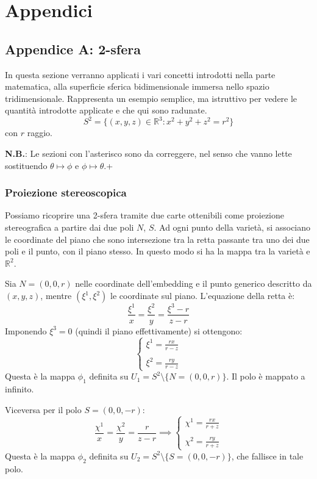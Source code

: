 \newpage
\chapter{Appendici}
\section{Appendice A: 2-sfera}
In questa sezione verranno applicati i vari concetti introdotti nella parte matematica, alla superficie sferica bidimensionale immersa nello spazio tridimensionale. Rappresenta un esempio semplice, ma istruttivo per vedere le quantità introdotte applicate e che qui sono radunate.
\begin{equation*}
    S^2 = \{ (x,y,z) \in \mathbb{R}^3 : x^2 + y^2 + z^2 = r^2\}
\end{equation*}
con $r$ raggio.

\textbf{N.B.}: Le sezioni con l'asterisco sono da correggere, nel senso che vanno lette sostituendo $\theta\mapsto\phi$ e $\phi\mapsto\theta$.+
\subsection{Proiezione stereoscopica}
Possiamo ricoprire una 2-sfera tramite due carte ottenibili come proiezione stereografica a partire dai due poli $N$, $S$. Ad ogni punto della varietà, si associano le coordinate del piano che sono intersezione tra la retta passante tra uno dei due poli e il punto, con il piano stesso. In questo modo si ha la mappa tra la varietà e $\mathbb{R}^2$.

Sia $N=(0,0,r)$ nelle coordinate dell'embedding e il punto generico descritto da $(x,y,z)$, mentre $(\xi^1,\xi^2)$ le coordinate sul piano. L'equazione della retta è:
\begin{equation*}
    \frac{\xi^1}{x} = \frac{\xi^2}{y} = \frac{\xi^3 - r}{z-r}
\end{equation*}
Imponendo $\xi^3 = 0$ (quindi il piano effettivamente) si ottengono:
\begin{equation*}
    \left\{\begin{array}{l}
        \xi^1 = \frac{rx}{r-z} \\ \\
        \xi^2 = \frac{ry}{r-z}
    \end{array}\right.
\end{equation*}
Questa è la mappa $\phi_1$ definita su $U_1 = S^2\setminus\{N=(0,0,r)\}$. Il polo è mappato a infinito.

Viceversa per il polo $S =(0,0,-r)$:
\begin{equation*}
    \frac{\chi^1}{x} = \frac{\chi^2}{y} = \frac{r}{z - r} \implies
    \left\{\begin{array}{l}
        \chi^1 = \frac{rx}{r+z} \\ \\
        \chi^2 = \frac{ry}{r+z}
    \end{array}\right.
\end{equation*}
Questa è la mappa $\phi_2$ definita su $U_2 = S^2 \setminus \{ S = (0,0,-r)\}$, che fallisce in tale polo.


